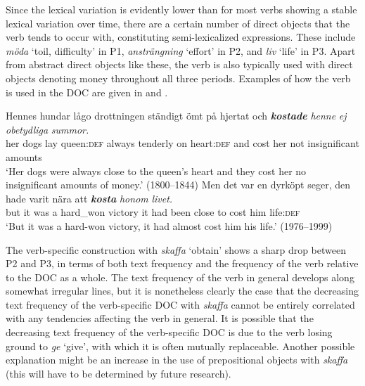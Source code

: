 \documentclass[output=paper]{langscibook}
\begin{document}
Since the lexical variation is evidently lower than for most verbs showing a stable lexical variation over time, there are a certain number of direct objects that the verb tends to occur with, constituting semi-lexicalized expressions. These include \textit{möda} ‘toil, difficulty’ in P1, \textit{ansträngning} ‘effort’ in P2, and \textit{liv} ‘life’ in P3. Apart from abstract direct objects like these, the verb is also typically used with direct objects denoting money throughout all three periods. Examples of how the verb is used in the DOC are given in  and .


\ea \label{ex:valdeson:26}
\gll Hennes hundar  lågo  drottningen  ständigt  ömt       på  hjertat {och} \textbf{\textit{kostade}} \textit{henne} \textit{ej} \textit{obetydliga} \textit{summor.}\\
  her         dogs       lay     queen\textsc{:def}     always   tenderly on heart:\textsc{def} and   cost         her   not   insignificant     amounts\\
\glt ‘Her dogs were always close to the queen’s heart and they cost her no insignificant amounts of money.’ (1800–1844)
\ex \label{ex:valdeson:27}
\gll Men   det   var   en   dyrköpt     seger,   den   hade   varit   nära {att} \textbf{\textit{kosta}} \textit{honom}   \textit{livet.}\\
  but       it           was     a   hard\_won  victory   it  had  been close to   cost       him     life:\textsc{def}\\
\glt `But it was a hard-won victory, it had almost cost him his life.’ (1976–1999)
\z


\label{sec:valdeson:5.3.3.5}

The verb-specific construction with \textit{skaffa} ‘obtain’ shows a sharp drop between P2 and P3, in terms of both text frequency and the frequency of the verb relative to the DOC as a whole. The text frequency of the verb in general develops along somewhat irregular lines, but it is nonetheless clearly the case that the decreasing text frequency of the verb-specific DOC with \textit{skaffa} cannot be entirely correlated with any tendencies affecting the verb in general. It is possible that the decreasing text frequency of the verb-specific DOC is due to the verb losing ground to \textit{ge} ‘give’, with which it is often mutually replaceable. Another possible explanation might be an increase in the use of prepositional objects with \textit{skaffa} (this will have to be determined by future research).
\end{document}
